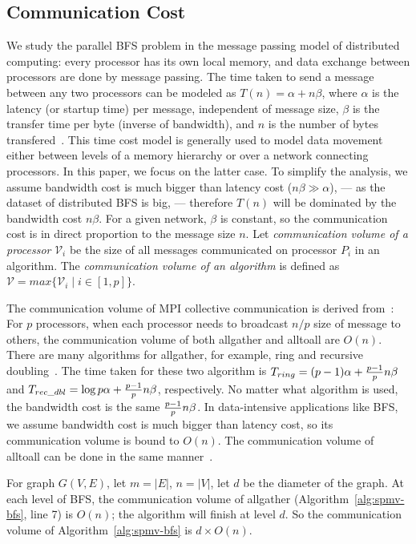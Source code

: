 \documentclass[conference]{IEEEtran}
\begin{document}
\subsection{Communication Cost}
\label{sec:model}
We study the parallel BFS problem in the message passing model of distributed
computing: every processor has its own local memory, and data exchange between
processors are done by message passing. The time taken to send a message
between any two processors can be modeled as $T(n)=\alpha + n\beta$, where
$\alpha$ is the latency (or startup time) per message, independent of message
size, $\beta$ is the transfer time per byte (inverse of bandwidth), and $n$ is
the number of bytes transfered~\cite{Kumar:2002}. This time cost model is
generally used to model data movement either between levels of a memory
hierarchy or over a network connecting processors. In this paper, we focus on
the latter case. To simplify the analysis, we assume bandwidth cost is much
bigger than latency cost ($n\beta \gg \alpha$), --- as the dataset of
distributed BFS is big, --- therefore $T(n)$ will be dominated by the
bandwidth cost $n\beta$. For a given network, $\beta$ is constant, so the
communication cost is in direct proportion to the message size $n$.
Let \textit{communication volume of a processor} $\mathcal{V}_i$ be the size
of all messages communicated on processor $P_i$ in an algorithm. The
\textit{communication volume of an algorithm} is defined as $\mathcal{V}=max
\{ \mathcal{V}_i \mid i \in [1,p] \}$.


The communication volume of MPI collective communication is derived
from~\cite{Thakur:03,Pjesivac-Grbovic:2007}: For $p$ processors, when each
processor needs to broadcast $n/p$ size of message to others, the
communication volume of both allgather and alltoall are $O(n)$.  There are
many algorithms for allgather, for example, ring and recursive
doubling~\cite{Thakur:03}. The time taken for these two algorithm is
$T_{ring}=(p-1)\alpha + {p-1 \over p} n \beta$ and $T_{rec\_dbl} = \log {p}
\alpha + {p-1 \over p} n \beta$, respectively. No matter what algorithm is
used, the bandwidth cost is the same ${p-1 \over p} n \beta$. In
data-intensive applications like BFS, we assume bandwidth cost is much bigger
than latency cost, so its communication volume is bound to $O(n)$. The
communication volume of alltoall can be done in the same
manner~\cite{Pjesivac-Grbovic:2007}.

For graph $G(V,E)$, let $m=|E|$, $n=|V|$, let $d$ be the diameter of the
graph. At each level of BFS, the communication volume of allgather
(Algorithm~\ref{alg:spmv-bfs}, line 7) is $O(n)$; the algorithm will finish at
level $d$. So the communication volume of Algorithm~\ref{alg:spmv-bfs} is $d
\times O(n)$.
\end{document}
